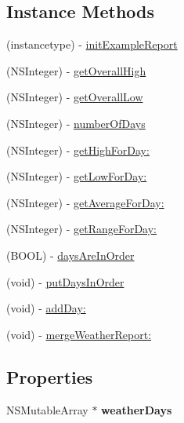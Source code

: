 \subsection*{Instance Methods}
\begin{DoxyCompactItemize}
\item 
(instancetype) -\/ \hyperlink{interface_weather_report_ab5d414a63da7d989ad099d5bf79be834}{init\-Example\-Report}
\item 
(N\-S\-Integer) -\/ \hyperlink{interface_weather_report_aa6bbf5b779e0c4598e198adfeef73caa}{get\-Overall\-High}
\item 
(N\-S\-Integer) -\/ \hyperlink{interface_weather_report_a8044a91695febcfbd290533f0a2d7014}{get\-Overall\-Low}
\item 
(N\-S\-Integer) -\/ \hyperlink{interface_weather_report_a43c87e18a2a90ba36e4426e066ec1bc0}{number\-Of\-Days}
\item 
(N\-S\-Integer) -\/ \hyperlink{interface_weather_report_a2f163b73346d557e8e69f1ba4658fd6a}{get\-High\-For\-Day\-:}
\item 
(N\-S\-Integer) -\/ \hyperlink{interface_weather_report_a69f1a204d1941aeab765e2ca4bfd989c}{get\-Low\-For\-Day\-:}
\item 
(N\-S\-Integer) -\/ \hyperlink{interface_weather_report_a486bd3a6c0a1fe14245772adf722f782}{get\-Average\-For\-Day\-:}
\item 
(N\-S\-Integer) -\/ \hyperlink{interface_weather_report_a0d47f6e58cf6ce3c488464935ab82ad4}{get\-Range\-For\-Day\-:}
\item 
(B\-O\-O\-L) -\/ \hyperlink{interface_weather_report_a40763395e5e7eb7dc1b5c42e6f23c83a}{days\-Are\-In\-Order}
\item 
(void) -\/ \hyperlink{interface_weather_report_a2ec4041c4bb88fe1c08f3c017b7e1465}{put\-Days\-In\-Order}
\item 
(void) -\/ \hyperlink{interface_weather_report_a7d7f448785554e24c855e207286a4ac1}{add\-Day\-:}
\item 
(void) -\/ \hyperlink{interface_weather_report_a3141fef4aec5172aa89170bf6bdd828c}{merge\-Weather\-Report\-:}
\end{DoxyCompactItemize}
\subsection*{Properties}
\begin{DoxyCompactItemize}
\item 
\hypertarget{interface_weather_report_a55a1d3dd268bda012d9a097a75497d84}{N\-S\-Mutable\-Array $\ast$ {\bfseries weather\-Days}}\label{interface_weather_report_a55a1d3dd268bda012d9a097a75497d84}

\end{DoxyCompactItemize}


